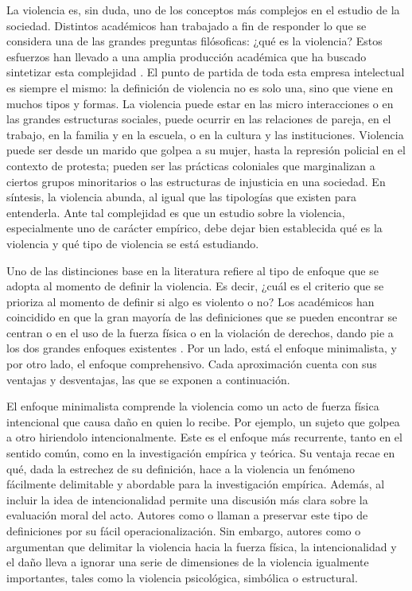 \documentclass[12pt,twoside]{templates/facsothesis}
\begin{document}
La violencia es, sin duda, uno de los conceptos más complejos en el estudio de la sociedad. Distintos académicos han trabajado a fin de responder lo que se considera una de las grandes preguntas filósoficas: ¿qué es la violencia? Estos esfuerzos han llevado a una amplia producción académica que ha buscado sintetizar esta complejidad \citep[e.g.][]{Kurt2008, Heitmeyer2005, Bufacchi2009a}. El punto de partida de toda esta empresa intelectual es siempre el mismo: la definición de violencia no es solo una, sino que viene en muchos tipos y formas. La violencia puede estar en las micro interacciones o en las grandes estructuras sociales, puede ocurrir en las relaciones de pareja, en el trabajo, en la familia y en la escuela, o en la cultura y las instituciones. Violencia puede ser desde un marido que golpea a su mujer, hasta la represión policial en el contexto de protesta; pueden ser las prácticas coloniales que marginalizan a ciertos grupos minoritarios o las estructuras de injusticia en una sociedad. En síntesis, la violencia abunda, al igual que las tipologías que existen para entenderla. Ante tal complejidad es que un estudio sobre la violencia, especialmente uno de carácter empírico, debe dejar bien establecida qué es la violencia y qué tipo de violencia se está estudiando.

Uno de las distinciones base en la literatura refiere al tipo de enfoque que se adopta al momento de definir la violencia. Es decir, ¿cuál es el criterio que se prioriza al momento de definir si algo es violento o no? Los académicos han coincidido en que la gran mayoría de las definiciones que se pueden encontrar se centran o en el uso de la fuerza física o en la violación de derechos, dando pie a los dos grandes enfoques existentes \citep{Bufacchi2005}. Por un lado, está el enfoque minimalista, y por otro lado, el enfoque comprehensivo. Cada aproximación cuenta con sus ventajas y desventajas, las que se exponen a continuación.

El enfoque minimalista comprende la violencia como un acto de fuerza física intencional que causa daño en quien lo recibe. Por ejemplo, un sujeto que golpea a otro hiriendolo intencionalmente. Este es el enfoque más recurrente, tanto en el sentido común, como en la investigación empírica y teórica. Su ventaja recae en qué, dada la estrechez de su definición, hace a la violencia un fenómeno fácilmente delimitable y abordable para la investigación empírica. Además, al incluir la idea de intencionalidad permite una discusión más clara sobre la evaluación moral del acto. Autores como \citet{Keane2004} o \citet{Coady2008} llaman a preservar este tipo de definiciones por su fácil operacionalización. Sin embargo, autores como \citet{Galtung1969} o \citet{Bufacchi2007} argumentan que delimitar la violencia hacia la fuerza física, la intencionalidad y el daño lleva a ignorar una serie de dimensiones de la violencia igualmente importantes, tales como la violencia psicológica, simbólica o estructural.
\end{document}
